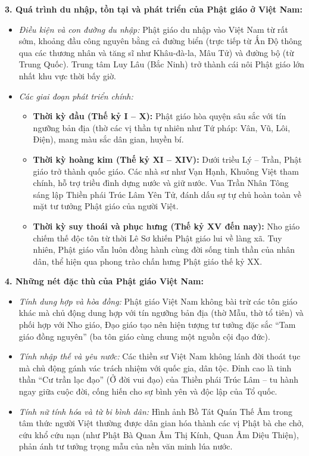 \documentclass[12pt,a4paper]{article}
\begin{document}
\noindent
\textbf{3. Quá trình du nhập, tồn tại và phát triển của Phật giáo ở Việt Nam:}
\begin{itemize}
    \item \textit{Điều kiện và con đường du nhập:} Phật giáo du nhập vào Việt Nam từ rất sớm, khoảng đầu công nguyên bằng cả đường biển (trực tiếp từ Ấn Độ thông qua các thương nhân và tăng sĩ như Khâu-đà-la, Mâu Tử) và đường bộ (từ Trung Quốc). Trung tâm Luy Lâu (Bắc Ninh) trở thành cái nôi Phật giáo lớn nhất khu vực thời bấy giờ.
    \item \textit{Các giai đoạn phát triển chính:}
    \begin{itemize}
        \item \textbf{Thời kỳ đầu (Thế kỷ I -- X):} Phật giáo hòa quyện sâu sắc với tín ngưỡng bản địa (thờ các vị thần tự nhiên như Tứ pháp: Vân, Vũ, Lôi, Điện), mang màu sắc dân gian, huyền bí.
        \item \textbf{Thời kỳ hoàng kim (Thế kỷ XI -- XIV):} Dưới triều Lý -- Trần, Phật giáo trở thành quốc giáo. Các nhà sư như Vạn Hạnh, Khuông Việt tham chính, hỗ trợ triều đình dựng nước và giữ nước. Vua Trần Nhân Tông sáng lập Thiền phái Trúc Lâm Yên Tử, đánh dấu sự tự chủ hoàn toàn về mặt tư tưởng Phật giáo của người Việt.
        \item \textbf{Thời kỳ suy thoái và phục hưng (Thế kỷ XV đến nay):} Nho giáo chiếm thế độc tôn từ thời Lê Sơ khiến Phật giáo lui về làng xã. Tuy nhiên, Phật giáo vẫn luôn đồng hành cùng đời sống tinh thần của nhân dân, thể hiện qua phong trào chấn hưng Phật giáo thế kỷ XX.
    \end{itemize}
\end{itemize}

\noindent
\textbf{4. Những nét đặc thù của Phật giáo Việt Nam:}
\begin{itemize}
    \item \textit{Tính dung hợp và hòa đồng:} Phật giáo Việt Nam không bài trừ các tôn giáo khác mà chủ động dung hợp với tín ngưỡng bản địa (thờ Mẫu, thờ tổ tiên) và phối hợp với Nho giáo, Đạo giáo tạo nên hiện tượng tư tưởng đặc sắc ``Tam giáo đồng nguyên'' (ba tôn giáo cùng chung một nguồn cội đạo đức).
    \item \textit{Tính nhập thế và yêu nước:} Các thiền sư Việt Nam không lánh đời thoát tục mà chủ động gánh vác trách nhiệm với quốc gia, dân tộc. Đỉnh cao là tinh thần ``Cư trần lạc đạo'' (Ở đời vui đạo) của Thiền phái Trúc Lâm -- tu hành ngay giữa cuộc đời, cống hiến cho sự bình yên và độc lập của Tổ quốc.
    \item \textit{Tính nữ tính hóa và từ bi bình dân:} Hình ảnh Bồ Tát Quán Thế Âm trong tâm thức người Việt thường được dân gian hóa thành các vị Phật bà che chở, cứu khổ cứu nạn (như Phật Bà Quan Âm Thị Kính, Quan Âm Diệu Thiện), phản ánh tư tưởng trọng mẫu của nền văn minh lúa nước.
\end{itemize}
\end{document}
